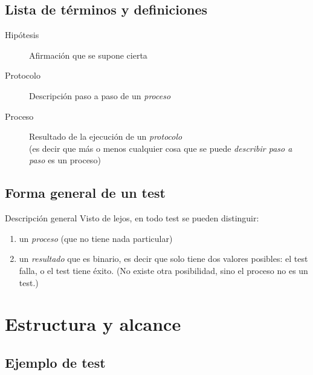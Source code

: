 \subsection{Lista de términos y definiciones}

  \begin{frame}{\insertsubsection}
    \begin{description}
      \item[Hipótesis] Afirmación que se supone cierta
      \item[Protocolo] Descripción paso a paso de un \emph{proceso}
      \item[Proceso] Resultado de la ejecución de un \emph{protocolo}\\
           (es decir que más o menos cualquier cosa que se puede \emph{describir paso a paso} es un proceso)
    \end{description}
  \end{frame}

\subsection{Forma general de un test}

  \begin{frame}{\insertsubsection}
    \begin{alertblock}{Descripción general}
      Visto de lejos, en todo test se pueden distinguir:
      \begin{enumerate}
        \item un \emph{proceso} (que no tiene nada particular)
        \item un \emph{resultado} que es \alert{binario}, es decir que solo tiene dos valores posibles: el test \alert{falla}, o el test \alert{tiene éxito}. (No existe otra posibilidad, sino el proceso no es un test.)
      \end{enumerate}
    \end{alertblock}
  \end{frame}

\section{Estructura y alcance}

  \begin{frame}
    \tableofcontents[currentsection]
  \end{frame}

%
\subsection{Ejemplo de test}


